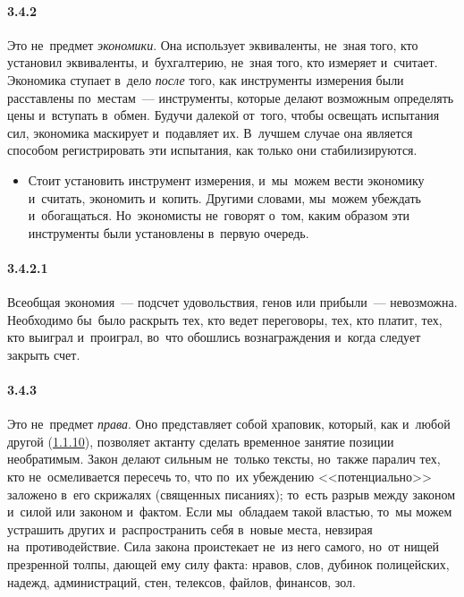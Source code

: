 \paragraph{3.4.2}\hypertarget{par:3.4.2}{} Это не~предмет {\itshape экономики}. Она использует эквиваленты, не~зная того, кто установил эквиваленты, и~бухгалтерию, не~зная того, кто измеряет и~считает. Экономика ступает в~дело {\itshape после} того, как инструменты измерения были расставлены по~местам~--- инструменты, которые делают возможным определять цены и~вступать в~обмен. Будучи далекой от~того, чтобы освещать испытания сил, экономика маскирует и~подавляет их. В~лучшем случае она является способом регистрировать эти испытания, как только они стабилизируются.
	\begin{itemize}
	\item 
	Стоит установить инструмент измерения, и~мы~можем вести экономику и~считать, экономить и~копить. Другими словами, мы~можем убеждать и~обогащаться. Но~экономисты не~говорят о~том, каким образом эти инструменты были установлены в~первую очередь.
	\end{itemize}

\paragraph{3.4.2.1}\hypertarget{par:3.4.2.1}{} Всеобщая экономия~--- подсчет удовольствия, генов или прибыли~--- невозможна. Необходимо бы~было раскрыть тех, кто ведет переговоры, тех, кто платит, тех, кто выиграл и~проиграл, во~что обошлись вознаграждения и~когда следует закрыть счет. 

\paragraph{3.4.3}\hypertarget{par:3.4.3}{} Это не~предмет {\itshape права}. Оно представляет собой храповик, который, как и~любой другой (\hyperlink{par:1.1.10}{1.1.10}), позволяет актанту сделать временное занятие позиции необратимым. Закон делают сильным не~только тексты, но~также паралич тех, кто не~осмеливается пересечь то, что по~их убеждению <<потенциально>> заложено в~его скрижалях (священных писаниях); то~есть разрыв между законом и~силой или законом и~фактом. Если мы~обладаем такой властью, то~мы можем устрашить других и~распространить себя в~новые места, невзирая на~противодействие. Сила закона проистекает не~из него самого, но~от нищей презренной толпы, дающей ему силу факта: нравов, слов, дубинок полицейских, надежд, администраций, стен, телексов, файлов, финансов, зол.

